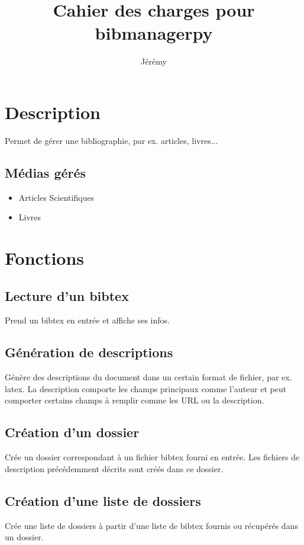 \documentclass[10pt]{article}
\begin{document}
\title{Cahier des charges pour bibmanagerpy}
\author{Jérémy}
\maketitle

\section{Description}

Permet de gérer une bibliographie, par ex. articles, livres...

\subsection{Médias gérés}

\begin{itemize}
 \item Articles Scientifiques
 \item Livres
\end{itemize}

\section{Fonctions}

\subsection{Lecture d'un bibtex}

Prend un bibtex en entrée et affiche ses infos.

\subsection{Génération de descriptions}

Génère des descriptions du document dans un certain format de fichier, par ex. latex.
La description comporte les champs principaux comme l'auteur et peut comporter certains champs à remplir comme 
les URL ou la description.

\subsection{Création d'un dossier}

Crée un dossier correspondant à un fichier bibtex fourni en entrée.
Les fichiers de description précédemment décrits sont créés dans ce dossier.

\subsection{Création d'une liste de dossiers}

Crée une liste de dossiers à partir d'une liste de bibtex fournis ou récupérés dans un dossier.
\end{document}
